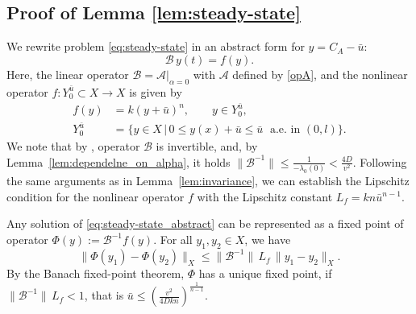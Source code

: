 \documentclass{mpi2015-cscpreprint}
\numberwithin{equation}{section}
\begin{document}


\subsection{Proof of Lemma \ref{lem:steady-state}}\label{sec:steady-state}
We rewrite problem \eqref{eq:steady-state} in an abstract form for $y=C_A-\bar{u}$:
\begin{equation}\label{eq:steady-state_abstract}
 \mathcal{B}\,{y}(t)=f(y).
\end{equation}
Here, the linear operator $\mathcal{B}=\mathcal{A}|_{\alpha=0}$ with $\mathcal{A}$ defined by \eqref{opA}, and the nonlinear operator $f:Y_0^{\bar{u}}\subset X\to X$ is given by 
\begin{equation*}
\begin{aligned}
f({y})&=k (y+\bar{u})^n, \qquad y\in Y_0^{\bar{u}},
\\Y_0^{\bar{u}} &= \{y\in X \,|\, 0\leqslant y(x)+\bar{u}\leqslant \bar{u}\;\text{ a.e. in }(0,l)\}.
\end{aligned}
\end{equation*}
We note that by \cite[Section~4.1]{CurZwa2020}, operator $\mathcal{B}$ is invertible, and, by Lemma~\ref{lem:dependelne_on_alpha}, it holds 
$\|\mathcal{B}^{-1}\|\leq\frac{1}{-\lambda_0(0)}<\frac{4D}{v^2}.$ 
Following the same arguments as in Lemma~\ref{lem:invariance}, we can establish the Lipschitz condition for the nonlinear operator $f$ with the Lipschitz constant $L_f=kn\bar{u}^{n-1}$.

Any solution of \eqref{eq:steady-state_abstract} can be represented as a fixed point of operator $\Phi(y):=\mathcal{B}^{-1}f(y)$. For all $y_1,y_2\in X$, we have
$$
\|\Phi(y_1)-\Phi(y_2)\|_X\leq\|\mathcal{B}^{-1}\|\,L_f\,\|y_1-y_2\|_X.
$$
By the Banach fixed-point theorem, $\Phi$ has a unique fixed point, if $\|\mathcal{B}^{-1}\|\,L_f<1$, that is $\bar{u}\le\left(\frac{v^2}{4Dkn}\right)^\frac{1}{n-1}$.
\end{document}
